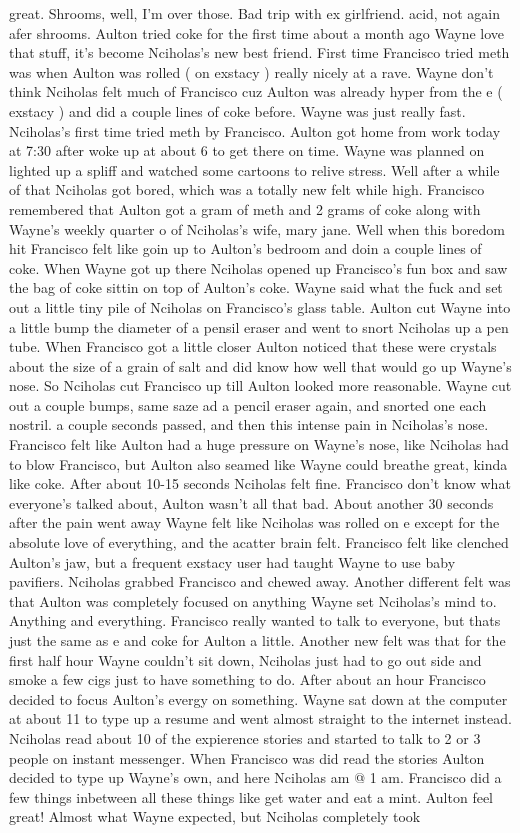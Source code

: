 \documentclass[12pt]{book}
\begin{document}
great. Shrooms, well, I'm over those. Bad trip with ex girlfriend. acid, not again afer shrooms. Aulton tried coke for the first time about a month ago Wayne love that stuff, it's become Nciholas's new best friend. First time Francisco tried meth was when Aulton was rolled ( on exstacy ) really nicely at a rave. Wayne don't think Nciholas felt much of Francisco cuz Aulton was already hyper from the e ( exstacy ) and did a couple lines of coke before. Wayne was just really fast. Nciholas's first time tried meth by Francisco. Aulton got home from work today at 7:30 after woke up at about 6 to get there on time. Wayne was planned on lighted up a spliff and watched some cartoons to relive stress. Well after a while of that Nciholas got bored, which was a totally new felt while high. Francisco remembered that Aulton got a gram of meth and 2 grams of coke along with Wayne's weekly quarter o of Nciholas's wife, mary jane. Well when this boredom hit Francisco felt like goin up to Aulton's bedroom and doin a couple lines of coke. When Wayne got up there Nciholas opened up Francisco's fun box and saw the bag of coke sittin on top of Aulton's coke. Wayne said what the fuck and set out a little tiny pile of Nciholas on Francisco's glass table. Aulton cut Wayne into a little bump the diameter of a pensil eraser and went to snort Nciholas up a pen tube. When Francisco got a little closer Aulton noticed that these were crystals about the size of a grain of salt and did know how well that would go up Wayne's nose. So Nciholas cut Francisco up till Aulton looked more reasonable. Wayne cut out a couple bumps, same saze ad a pencil eraser again, and snorted one each nostril. a couple seconds passed, and then this intense pain in Nciholas's nose. Francisco felt like Aulton had a huge pressure on Wayne's nose, like Nciholas had to blow Francisco, but Aulton also seamed like Wayne could breathe great, kinda like coke. After about 10-15 seconds Nciholas felt fine. Francisco don't know what everyone's talked about, Aulton wasn't all that bad. About another 30 seconds after the pain went away Wayne felt like Nciholas was rolled on e except for the absolute love of everything, and the acatter brain felt. Francisco felt like clenched Aulton's jaw, but a frequent exstacy user had taught Wayne to use baby pavifiers. Nciholas grabbed Francisco and chewed away. Another different felt was that Aulton was completely focused on anything Wayne set Nciholas's mind to. Anything and everything. Francisco really wanted to talk to everyone, but thats just the same as e and coke for Aulton a little. Another new felt was that for the first half hour Wayne couldn't sit down, Nciholas just had to go out side and smoke a few cigs just to have something to do. After about an hour Francisco decided to focus Aulton's evergy on something. Wayne sat down at the computer at about 11 to type up a resume and went almost straight to the internet instead. Nciholas read about 10 of the expierence stories and started to talk to 2 or 3 people on instant messenger. When Francisco was did read the stories Aulton decided to type up Wayne's own, and here Nciholas am @ 1 am. Francisco did a few things inbetween all these things like get water and eat a mint. Aulton feel great! Almost what Wayne expected, but Nciholas completely took 
\end{document}
